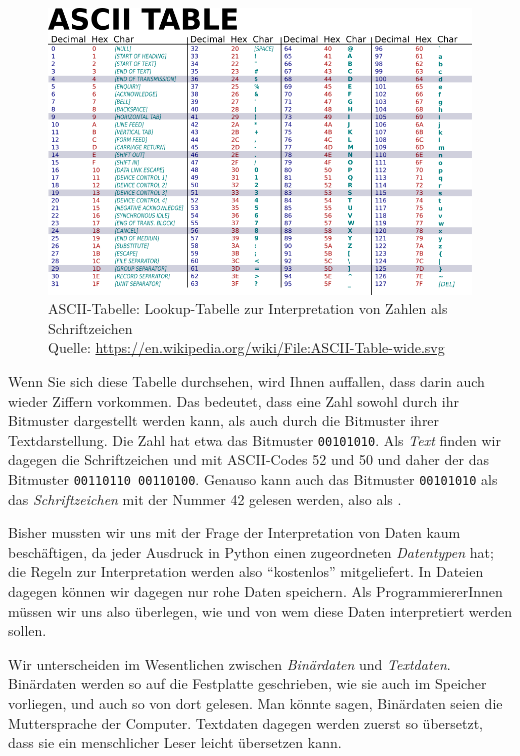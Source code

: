 \begin{figure}
\begin{center}
	\includegraphics[width=.8\linewidth]{./gfx/ASCII_table}
	\caption[
		ASCII-Tabelle: Lookup-Tabelle zur Interpretation von Zahlen als Schriftzeichen
	]{
		ASCII-Tabelle: Lookup-Tabelle zur Interpretation von Zahlen als Schriftzeichen\\
		Quelle: \url{https://en.wikipedia.org/wiki/File:ASCII-Table-wide.svg}
	}
	\label{fig:ASCII}
\end{center}
\end{figure}

Wenn Sie sich diese Tabelle durchsehen, wird Ihnen auffallen, dass darin auch wieder Ziffern vorkommen. Das bedeutet, dass eine Zahl sowohl durch ihr Bitmuster dargestellt werden kann, als auch durch die Bitmuster ihrer Textdarstellung. Die Zahl  hat etwa das Bitmuster \texttt{00101010}. Als \emph{Text}  finden wir dagegen die Schriftzeichen  und  mit ASCII-Codes 52 und 50 und daher der das Bitmuster \texttt{00110110 00110100}. Genauso kann auch das Bitmuster \texttt{00101010} als das \emph{Schriftzeichen} mit der Nummer 42 gelesen werden, also als .

Bisher mussten wir uns mit der Frage der Interpretation von Daten kaum beschäftigen, da jeder Ausdruck in Python einen zugeordneten \emph{Datentypen} hat; die Regeln zur Interpretation werden also \enquote{kostenlos} mitgeliefert. In Dateien dagegen können wir dagegen nur rohe Daten speichern. Als ProgrammiererInnen müssen wir uns also überlegen, wie und von wem diese Daten interpretiert werden sollen.

Wir unterscheiden im Wesentlichen zwischen \emph{Binärdaten} und \emph{Textdaten}. Binärdaten werden so auf die Festplatte geschrieben, wie sie auch im Speicher vorliegen, und auch so von dort gelesen. Man könnte sagen, Binärdaten seien die Muttersprache der Computer. Textdaten dagegen werden zuerst so übersetzt, dass sie ein menschlicher Leser leicht übersetzen kann.

